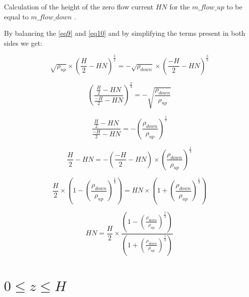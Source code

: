 \documentclass[a4paper, english]{article}
\begin{document}
            Calculation of the height of the zero flow current $ HN $ for the $ m\_flow\_up $ to be equal to $ m\_flow\_down $ .
            
            By balancing the \eqref{eq9} and \eqref{eq10} and by simplifying the terms present in both sides we get:
            
            \begin{equation*}
                    \sqrt{ \rho_{up} } \times {\left( \frac{H}{2} - HN \right)}^\frac{3}{2} = - \sqrt{ \rho_{down} } \times {\left( \frac{-H}{2} - HN \right)}^\frac{3}{2}
            \end{equation*} 
            
            \begin{equation*}
                \left({ \frac{ \frac{H}{2} - HN }{ \frac{-H}{2} - HN } }\right)^\frac{2}{3} = -\sqrt{\frac{\rho_{down}}{\rho_{up}}}
            \end{equation*}            
            
            \begin{equation*}
                \frac{ \frac{H}{2} - HN }{ \frac{-H}{2} - HN } = -\left( {\frac{\rho_{down}}{\rho_{up}}} \right)^\frac{1}{3}
            \end{equation*} 

            \begin{equation*}
                \frac{H}{2} - HN = - \left( \frac{-H}{2} - HN \right) \times \left( {\frac{\rho_{down}}{\rho_{up}}} \right)^\frac{1}{3}
            \end{equation*} 
            
            \begin{equation*}
                \frac{H}{2} \times \left( 1 - \left( {\frac{\rho_{down}}{\rho_{up}}} \right)^\frac{1}{3} \right) = HN \times \left( 1 + \left( {\frac{\rho_{down}}{\rho_{up}}} \right)^\frac{1}{3} \right)
            \end{equation*}

            \begin{equation}
                \label{eq11}
                HN = \frac{H}{2} \times \frac{ \left( 1 - \left( {\frac{\rho_{down}}{\rho_{up}}} \right)^\frac{1}{3} \right) }{ \left( 1 + \left( {\frac{\rho_{down}}{\rho_{up}}} \right)^\frac{1}{3} \right) }
            \end{equation}
           

    \section{$0 \leq z \leq H $}
    
\end{document}
